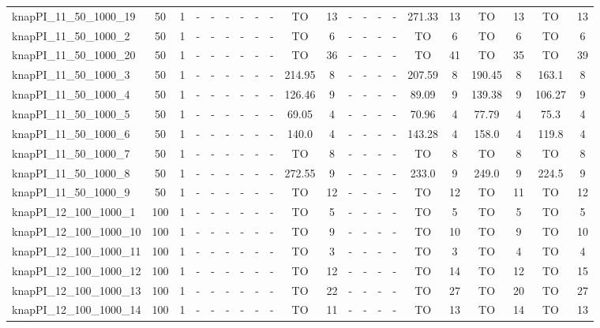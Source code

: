 \begin{sidewaystable}[!ht]
{\begin{tabular}{lcccccccccccccccccccc}
knapPI\_11\_50\_1000\_19 & 50 & 1 &  - &  - &  - &  - &  - &  - & TO & 13 &  - &  - &  - &  - & 271.33 & 13 & TO & 13 & TO & 13 \\
knapPI\_11\_50\_1000\_2 & 50 & 1 &  - &  - &  - &  - &  - &  - & TO & 6 &  - &  - &  - &  - & TO & 6 & TO & 6 & TO & 6 \\
knapPI\_11\_50\_1000\_20 & 50 & 1 &  - &  - &  - &  - &  - &  - & TO & 36 &  - &  - &  - &  - & TO & 41 & TO & 35 & TO & 39 \\
knapPI\_11\_50\_1000\_3 & 50 & 1 &  - &  - &  - &  - &  - &  - & 214.95 & 8 &  - &  - &  - &  - & 207.59 & 8 & 190.45 & 8 & 163.1 & 8 \\
knapPI\_11\_50\_1000\_4 & 50 & 1 &  - &  - &  - &  - &  - &  - & 126.46 & 9 &  - &  - &  - &  - & 89.09 & 9 & 139.38 & 9 & 106.27 & 9 \\
knapPI\_11\_50\_1000\_5 & 50 & 1 &  - &  - &  - &  - &  - &  - & 69.05 & 4 &  - &  - &  - &  - & 70.96 & 4 & 77.79 & 4 & 75.3 & 4 \\
knapPI\_11\_50\_1000\_6 & 50 & 1 &  - &  - &  - &  - &  - &  - & 140.0 & 4 &  - &  - &  - &  - & 143.28 & 4 & 158.0 & 4 & 119.8 & 4 \\
knapPI\_11\_50\_1000\_7 & 50 & 1 &  - &  - &  - &  - &  - &  - & TO & 8 &  - &  - &  - &  - & TO & 8 & TO & 8 & TO & 8 \\
knapPI\_11\_50\_1000\_8 & 50 & 1 &  - &  - &  - &  - &  - &  - & 272.55 & 9 &  - &  - &  - &  - & 233.0 & 9 & 249.0 & 9 & 224.5 & 9 \\
knapPI\_11\_50\_1000\_9 & 50 & 1 &  - &  - &  - &  - &  - &  - & TO & 12 &  - &  - &  - &  - & TO & 12 & TO & 11 & TO & 12 \\
knapPI\_12\_100\_1000\_1 & 100 & 1 &  - &  - &  - &  - &  - &  - & TO & 5 &  - &  - &  - &  - & TO & 5 & TO & 5 & TO & 5 \\
knapPI\_12\_100\_1000\_10 & 100 & 1 &  - &  - &  - &  - &  - &  - & TO & 9 &  - &  - &  - &  - & TO & 10 & TO & 9 & TO & 10 \\
knapPI\_12\_100\_1000\_11 & 100 & 1 &  - &  - &  - &  - &  - &  - & TO & 3 &  - &  - &  - &  - & TO & 3 & TO & 4 & TO & 4 \\
knapPI\_12\_100\_1000\_12 & 100 & 1 &  - &  - &  - &  - &  - &  - & TO & 12 &  - &  - &  - &  - & TO & 14 & TO & 12 & TO & 15 \\
knapPI\_12\_100\_1000\_13 & 100 & 1 &  - &  - &  - &  - &  - &  - & TO & 22 &  - &  - &  - &  - & TO & 27 & TO & 20 & TO & 27 \\
knapPI\_12\_100\_1000\_14 & 100 & 1 &  - &  - &  - &  - &  - &  - & TO & 11 &  - &  - &  - &  - & TO & 13 & TO & 14 & TO & 13 \\

\end{tabular}}
\end{sidewaystable}
